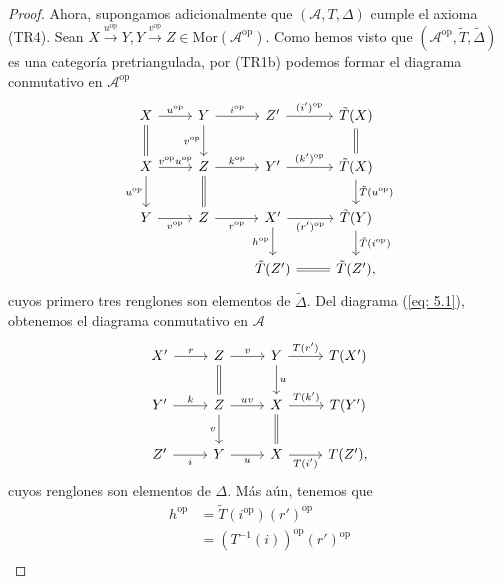 \documentclass[tesis]{subfiles}
\begin{document}
\begin{proof}
    Ahora, supongamos adicionalmente que $(\mathscr{A},T,\Delta)$ cumple el axioma (TR4). Sean $X\xrightarrow[]{u^\text{op}}Y, Y\xrightarrow[]{v^\text{op}}Z\in\text{Mor}(\mathscr{A}^\text{op})$. Como hemos visto que $(\mathscr{A}^\text{op},\tilde{T},\tilde{\Delta})$ es una categoría pretriangulada, por (TR1b) podemos formar el diagrama conmutativo en $\mathscr{A}^\text{op}$
    \begin{equation}\label{eq: 5.1}
        \begin{tikzcd}
            X \arrow[equals]{d}[]{} \arrow[]{r}[]{u^\text{op}} &Y \arrow[]{d}[swap]{v^\text{op}} \arrow[]{r}[]{i^\text{op}} &Z' \arrow[]{r}[]{(i')^\text{op}} &\tilde{T}(X) \arrow[equals]{d}[]{} \\
            X \arrow[]{d}[swap]{u^\text{op}} \arrow[]{r}[]{v^\text{op}u^\text{op}} &Z \arrow[equals]{d}[]{} \arrow[]{r}[]{k^\text{op}} &Y' \arrow[]{r}[]{(k')^\text{op}} &\tilde{T}(X) \arrow[]{d}[]{\tilde{T}(u^\text{op})} \\
            Y \arrow[]{r}[swap]{v^\text{op}} &Z \arrow[]{r}[swap]{r^\text{op}} &X' \arrow[]{d}[swap]{h^\text{op}} \arrow[]{r}[swap]{(r')^\text{op}} &\tilde{T}(Y) \arrow[]{d}[]{\tilde{T}(i^\text{op})} \\
                                             &&\tilde{T}(Z') \arrow[equals]{r}[]{} &\tilde{T}(Z'),
        \end{tikzcd}
    \end{equation}
    cuyos primero tres renglones son elementos de $\tilde{\Delta}$. Del diagrama (\ref{eq: 5.1}), obtenemos el diagrama conmutativo en $\mathscr{A}$
    \begin{equation}\label{eq: 5.2}
        \begin{tikzcd}
            X' \arrow[]{r}[]{r} &Z \arrow[]{r}[]{v} \arrow[equals]{d}[]{} &Y \arrow[]{d}[]{u} \arrow[]{r}[]{T(r')} &T(X') \\
            Y' \arrow[]{r}[]{k} &Z \arrow[]{d}[swap]{v} \arrow[]{r}[]{uv} &X \arrow[equals]{d}[]{} \arrow[]{r}[]{T(k')} &T(Y') \\
            Z' \arrow[]{r}[swap]{i} &Y \arrow[]{r}[swap]{u} &X \arrow[]{r}[swap]{T(i')} &T(Z'),
        \end{tikzcd}
    \end{equation}
    cuyos renglones son elementos de $\Delta$. Más aún, tenemos que
    \begin{align*}
        h^\text{op} &= \tilde{T}(i^\text{op}) (r')^\text{op} \\
                    &= (T^{-1}(i))^\text{op} (r')^\text{op} \\

\end{align*}
\end{proof}
\end{document}
